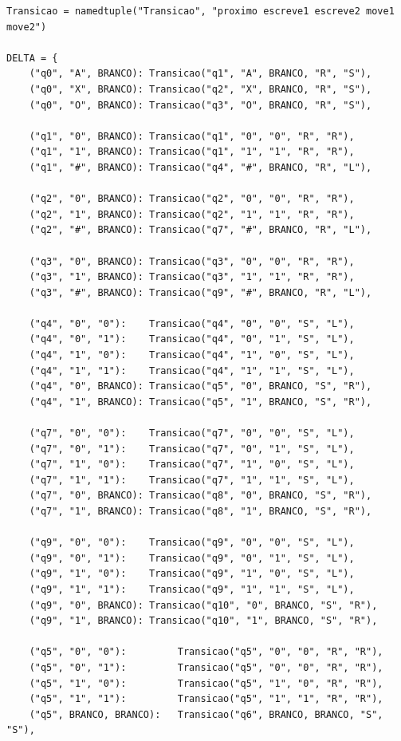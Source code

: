 \documentclass[report, 12pt]{uftreport}
\begin{document}
\begin{lstlisting}[style=python, caption={Função de transição $\delta$}, label={lst:delta}]
Transicao = namedtuple("Transicao", "proximo escreve1 escreve2 move1 move2")

DELTA = {
    ("q0", "A", BRANCO): Transicao("q1", "A", BRANCO, "R", "S"),
    ("q0", "X", BRANCO): Transicao("q2", "X", BRANCO, "R", "S"),
    ("q0", "O", BRANCO): Transicao("q3", "O", BRANCO, "R", "S"),

    ("q1", "0", BRANCO): Transicao("q1", "0", "0", "R", "R"),
    ("q1", "1", BRANCO): Transicao("q1", "1", "1", "R", "R"),
    ("q1", "#", BRANCO): Transicao("q4", "#", BRANCO, "R", "L"),

    ("q2", "0", BRANCO): Transicao("q2", "0", "0", "R", "R"),
    ("q2", "1", BRANCO): Transicao("q2", "1", "1", "R", "R"),
    ("q2", "#", BRANCO): Transicao("q7", "#", BRANCO, "R", "L"),

    ("q3", "0", BRANCO): Transicao("q3", "0", "0", "R", "R"),
    ("q3", "1", BRANCO): Transicao("q3", "1", "1", "R", "R"),
    ("q3", "#", BRANCO): Transicao("q9", "#", BRANCO, "R", "L"),

    ("q4", "0", "0"):    Transicao("q4", "0", "0", "S", "L"),
    ("q4", "0", "1"):    Transicao("q4", "0", "1", "S", "L"),
    ("q4", "1", "0"):    Transicao("q4", "1", "0", "S", "L"),
    ("q4", "1", "1"):    Transicao("q4", "1", "1", "S", "L"),
    ("q4", "0", BRANCO): Transicao("q5", "0", BRANCO, "S", "R"),
    ("q4", "1", BRANCO): Transicao("q5", "1", BRANCO, "S", "R"),

    ("q7", "0", "0"):    Transicao("q7", "0", "0", "S", "L"),
    ("q7", "0", "1"):    Transicao("q7", "0", "1", "S", "L"),
    ("q7", "1", "0"):    Transicao("q7", "1", "0", "S", "L"),
    ("q7", "1", "1"):    Transicao("q7", "1", "1", "S", "L"),
    ("q7", "0", BRANCO): Transicao("q8", "0", BRANCO, "S", "R"),
    ("q7", "1", BRANCO): Transicao("q8", "1", BRANCO, "S", "R"),

    ("q9", "0", "0"):    Transicao("q9", "0", "0", "S", "L"),
    ("q9", "0", "1"):    Transicao("q9", "0", "1", "S", "L"),
    ("q9", "1", "0"):    Transicao("q9", "1", "0", "S", "L"),
    ("q9", "1", "1"):    Transicao("q9", "1", "1", "S", "L"),
    ("q9", "0", BRANCO): Transicao("q10", "0", BRANCO, "S", "R"),
    ("q9", "1", BRANCO): Transicao("q10", "1", BRANCO, "S", "R"),

    ("q5", "0", "0"):         Transicao("q5", "0", "0", "R", "R"),
    ("q5", "0", "1"):         Transicao("q5", "0", "0", "R", "R"),
    ("q5", "1", "0"):         Transicao("q5", "1", "0", "R", "R"),
    ("q5", "1", "1"):         Transicao("q5", "1", "1", "R", "R"),
    ("q5", BRANCO, BRANCO):   Transicao("q6", BRANCO, BRANCO, "S", "S"),


\end{lstlisting}
\end{document}
